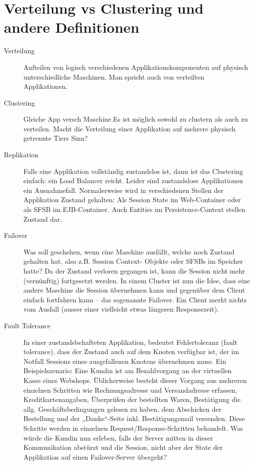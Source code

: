\documentclass[a4paper,10pt]{scrreprt}
\begin{document}
\section{Verteilung vs Clustering und andere Definitionen} %
\label{sec:verteilung_vs_clustering}
\begin{description}
	\item[Verteilung] Aufteilen von logisch
verschiedenen Applikationskomponenten
auf physisch unterschiedliche Maschinen.
Man spricht auch von verteilten
Applikationen.
\item[Clustering] Gleiche App versch Maschine.Es ist möglich sowohl zu clustern als auch zu verteilen. Macht die Verteilung einer Applikation auf mehrere
physisch getrennte Tiers Sinn?
\item[Replikation] Falls eine Applikation vollständig zustandslos ist, dann ist das Clustering einfach: ein Load Balancer reicht. Leider
sind zustandslose Applikationen ein Ausnahmefall. Normalerweise wird in verschiedenen Stellen der Applikation
Zustand gehalten: Als Session State im Web-Container oder als SFSB im EJB-Container. Auch Entities im
Persistence-Context stellen Zustand dar.
\item[Failover] Was soll geschehen, wenn eine Maschine ausfällt, welche noch Zustand gehalten hat, also z.B. Session Context-
Objekte oder SFSBs im Speicher hatte? Da der Zustand verloren gegangen ist, kann die Session nicht mehr
(vernünftig) fortgesetzt werden.
In einem Cluster ist nun die Idee, dass eine andere Maschine die Session übernehmen kann und gegenüber dem
Client einfach fortfahren kann – das sogenannte Failover. Ein Client merkt nichts vom Ausfall (ausser einer
vielleicht etwas längeren Responsezeit).
\item[Fault Tolerance] In einer zustandsbehafteten Applikation, bedeutet Fehlertoleranz (fault tolerance), dass der Zustand auch auf
dem Knoten verfügbar ist, der im Notfall Sessions eines ausgefallenen Knotens übernehmen muss.
Ein Beispielszenario: Eine Kundin ist am Bezahlvorgang an der virtuellen Kasse eines Webshops. Üblicherweise
besteht dieser Vorgang aus mehreren einzelnen Schritten wie Rechnungsadresse und Versandadresse erfassen,
Kreditkartenangaben, Überprüfen der bestellten Waren, Bestätigung die allg. Geschäftsbedingungen gelesen zu
haben, dem Abschicken der Bestellung und der „Danke“-Seite inkl. Bestätigungsmail versenden. Diese Schritte
werden in einzelnen Request/Response-Schritten behandelt. Was würde die Kundin nun erleben, falls der
Server mitten in dieser Kommunikation abstürzt und die Session, nicht aber der State der Applikation auf einen
Failover-Server übergeht?


\end{description}
\end{document}
